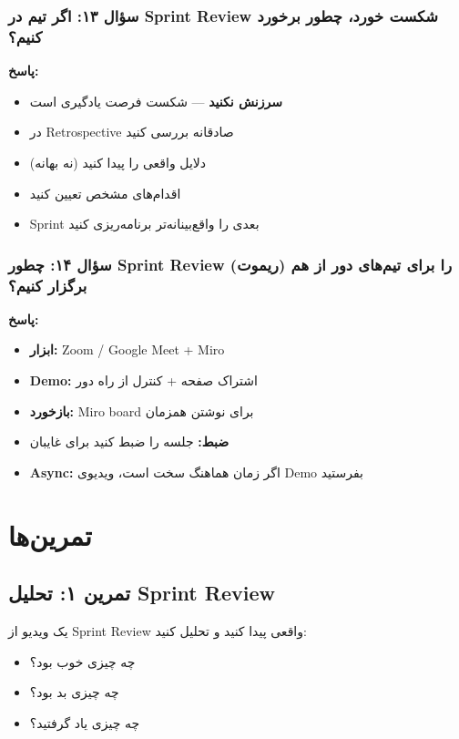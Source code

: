 \documentclass[12pt, a4paper]{article}
\begin{document}
\subsubsection{سؤال ۱۳: اگر تیم در Sprint Review شکست خورد، چطور برخورد 
کنیم؟}
\textbf{پاسخ:}
\begin{itemize}
    \item \textbf{سرزنش نکنید} — شکست فرصت یادگیری است
    \item در Retrospective صادقانه بررسی کنید
    \item دلایل واقعی را پیدا کنید (نه بهانه)
    \item اقدام‌های مشخص تعیین کنید
    \item Sprint بعدی را واقع‌بینانه‌تر برنامه‌ریزی کنید
\end{itemize}

\subsubsection{سؤال ۱۴: چطور Sprint Review را برای تیم‌های دور از هم 
(ریموت) برگزار کنیم؟}
\textbf{پاسخ:}
\begin{itemize}
    \item \textbf{ابزار:} Zoom / Google Meet + Miro
    \item \textbf{Demo:} اشتراک صفحه + کنترل از راه دور
    \item \textbf{بازخورد:} Miro board برای نوشتن همزمان
    \item \textbf{ضبط:} جلسه را ضبط کنید برای غایبان
    \item \textbf{Async:} اگر زمان هماهنگ سخت است، ویدیوی Demo بفرستید
\end{itemize}

\section{تمرین‌ها}

\subsection{تمرین ۱: تحلیل Sprint Review}
یک ویدیو از Sprint Review واقعی پیدا کنید و تحلیل کنید:
\begin{itemize}
    \item چه چیزی خوب بود؟
    \item چه چیزی بد بود؟
    \item چه چیزی یاد گرفتید؟
\end{itemize}
\end{document}
